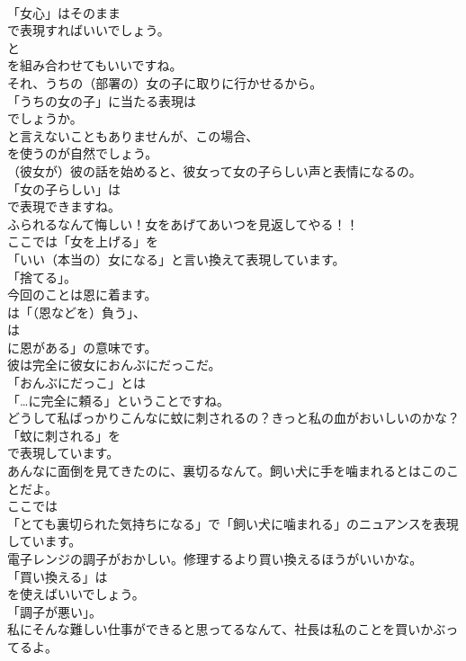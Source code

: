 \documentclass[8pt]{extreport}
\begin{document}
\begin{CJK}{UTF8}{min}
\\	「女心」はそのまま 
\\	で表現すればいいでしょう。
\\	と 
\\	を組み合わせてもいいですね。	
\\	それ、うちの（部署の）女の子に取りに行かせるから。 
\\	「うちの女の子」に当たる表現は
\\	でしょうか。
\\	と言えないこともありませんが、この場合、
\\	を使うのが自然でしょう。	
\\	（彼女が）彼の話を始めると、彼女って女の子らしい声と表情になるの。 
\\	「女の子らしい」は
\\	で表現できますね。	
\\	ふられるなんて悔しい！女をあげてあいつを見返してやる！！ 
\\	ここでは「女を上げる」を
\\	「いい（本当の）女になる」と言い換えて表現しています。
\\	「捨てる」。	
\\	今回のことは恩に着ます。 
\\	は「（恩などを）負う」、
\\	は
\\	に恩がある」の意味です。	
\\	彼は完全に彼女におんぶにだっこだ。 
\\	「おんぶにだっこ」とは
\\	「…に完全に頼る」ということですね。	
\\	どうして私ばっかりこんなに蚊に刺されるの？きっと私の血がおいしいのかな？ 
\\	「蚊に刺される」を 
\\	で表現しています。	
\\	あんなに面倒を見てきたのに、裏切るなんて。飼い犬に手を噛まれるとはこのことだよ。 
\\	ここでは
\\	「とても裏切られた気持ちになる」で「飼い犬に噛まれる」のニュアンスを表現しています。	
\\	電子レンジの調子がおかしい。修理するより買い換えるほうがいいかな。 
\\	「買い換える」は
\\	を使えばいいでしょう。
\\	「調子が悪い」。	
\\	私にそんな難しい仕事ができると思ってるなんて、社長は私のことを買いかぶってるよ。 

\end{CJK}
\end{document}
